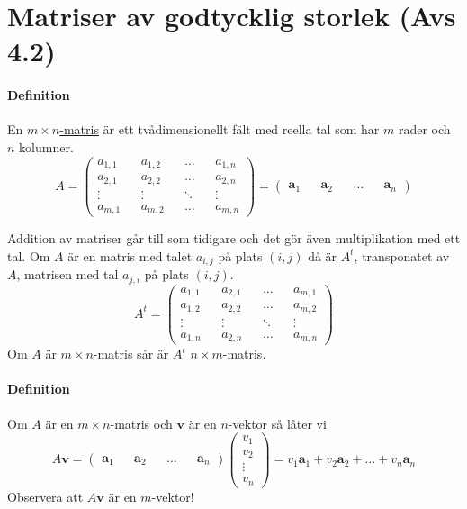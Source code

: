 \section{Matriser av godtycklig storlek (Avs 4.2)}
\paragraph{Definition} En \underline{$m\times n$-matris} är ett tvådimensionellt fält med reella tal som har $m$ rader och $n$ kolumner.
\begin{equation*}
    A=\begin{pmatrix}
        a_{1,1} && a_{1,2} && \ldots && a_{1,n}\\
        a_{2,1} && a_{2,2} && \ldots && a_{2,n}\\
        \vdots && \vdots && \ddots && \vdots\\
        a_{m,1} && a_{m,2} && \ldots && a_{m,n}
    \end{pmatrix} = \begin{pmatrix}
        \bm{a}_{1} && \bm{a}_{2} && \ldots && \bm{a}_{n}
    \end{pmatrix}
\end{equation*}

Addition av matriser går till som tidigare och det gör även multiplikation med ett tal.
Om $A$ är en matris med talet $a_{i,j}$ på plats $(i,j)$ då är $A^{t}$, transponatet av $A$, matrisen med tal $a_{j,i}$ på plats $(i,j)$.
\begin{equation*}
    A^{t}=\begin{pmatrix}
        a_{1,1} && a_{2,1} && \ldots && a_{m,1}\\
        a_{1,2} && a_{2,2} && \ldots && a_{m,2}\\
        \vdots && \vdots && \ddots && \vdots\\
        a_{1,n} && a_{2,n} && \ldots && a_{m,n}
    \end{pmatrix}
\end{equation*}
Om $A$ är $m\times n$-matris sår är $A^{t}$ $n\times m$-matris.

\paragraph{Definition} Om $A$ är en $m\times n$-matris och $\bm{v}$ är en $n$-vektor så låter vi 
\begin{equation*}
    A\bm{v}=\begin{pmatrix}
        \bm{a}_{1}&&\bm{a}_{2}&& \ldots &&\bm{a}_{n}
    \end{pmatrix}\begin{pmatrix}
        v_{1}\\ v_{2}\\ \vdots \\ v_{n}
    \end{pmatrix}=v_{1}\bm{a}_{1}+v_{2}\bm{a}_{2}+\ldots+v_{n}\bm{a}_{n}
\end{equation*}
Observera att $A\bm{v}$ är en $m$-vektor!


